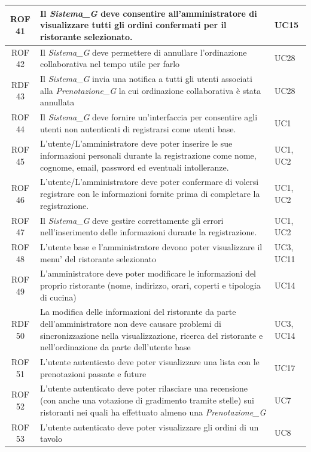 \documentclass[12pt, oneside]{article}
\begin{document}
\begin{longtable}{|c|p{14cm}|p{2cm}|}
    \hline
    ROF 41 & Il \textit{Sistema_G} deve consentire all'amministratore di visualizzare tutti gli ordini confermati per il ristorante selezionato. & UC15 \\
    \hline
    ROF 42 & Il \textit{Sistema_G} deve permettere di annullare l'ordinazione collaborativa nel tempo utile per farlo & UC28 \\
    \hline
    RDF 43 & Il \textit{Sistema_G} invia una notifica a tutti gli utenti associati alla \textit{Prenotazione_G} la cui ordinazione collaborativa è stata annullata & UC28 \\
    \hline
    ROF 44 & Il \textit{Sistema_G} deve fornire un'interfaccia per consentire agli utenti non autenticati di registrarsi come utenti base. & UC1 \\
    \hline
    ROF 45 & L'utente/L'amministratore deve poter inserire le sue informazioni personali durante la registrazione come nome, cognome, email, password ed eventuali intolleranze. & UC1, UC2 \\
    \hline
    ROF 46 & L'utente/L'amministratore deve poter confermare di volersi registrare con le informazioni fornite prima di completare la registrazione. & UC1, UC2 \\
    \hline
    ROF 47 & Il \textit{Sistema_G} deve gestire correttamente gli errori nell'inserimento delle informazioni durante la registrazione. & UC1, UC2 \\
    \hline 
    ROF 48 & L'utente base e l'amministratore devono poter visualizzare il menu' del ristorante selezionato & UC3, UC11\\
    \hline
    ROF 49 & L'amministratore deve poter modificare le informazioni del proprio ristorante (nome, indirizzo, orari, coperti e tipologia di cucina) & UC14\\
    \hline
    RDF 50 & La modifica delle informazioni del ristorante da parte dell'amministratore non deve causare problemi di sincronizzazione nella visualizzazione, ricerca del ristorante e nell'ordinazione da parte dell'utente base & UC3, UC14 \\
    \hline
    ROF 51 & L'utente autenticato deve poter visualizzare una lista con le prenotazioni passate e future & UC17 \\
    \hline
    ROF 52 & L'utente autenticato deve poter rilasciare una recensione (con anche una votazione di gradimento tramite stelle) sui ristoranti nei quali ha effettuato almeno una \textit{Prenotazione_G} & UC7 \\
    \hline
    ROF 53 & L'utente autenticato deve poter visualizzare gli ordini di un tavolo & UC8 \\

\end{longtable}
\end{document}
